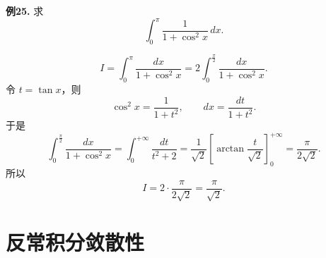 \begin{problemblock}
\textbf{例25.} 求
\[
\int_0^\pi\frac{1}{1+\cos^2x}\,dx.
\]
\end{problemblock}
\begin{solutionblock}
\[
I=\int_0^\pi\frac{dx}{1+\cos^2x}
=2\int_0^{\frac\pi2}\frac{dx}{1+\cos^2x}.
\]
令 \(t=\tan x\)，则
\[
\cos^2x=\frac1{1+t^2},\qquad dx=\frac{dt}{1+t^2}.
\]
于是
\[
\int_0^{\frac\pi2}\frac{dx}{1+\cos^2x}
=\int_0^{+\infty}\frac{dt}{t^2+2}
=\frac1{\sqrt2}\left[\arctan\frac{t}{\sqrt2}\right]_0^{+\infty}
=\frac{\pi}{2\sqrt2}.
\]
所以
\[
I=2\cdot\frac{\pi}{2\sqrt2}
=\frac{\pi}{\sqrt2}.
\]
\end{solutionblock}

\section{反常积分敛散性}


